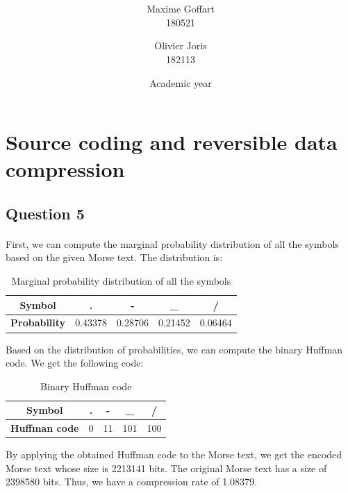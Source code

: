 \documentclass[a4paper, 11pt, oneside]{article}
\title{\ClassName\\\vspace*{0.8cm}\ProjectName\vspace{1cm}}
\author{Maxime Goffart \\180521 \and Olivier Joris\\182113}
\date{\vspace{1cm}Academic year \AcademicYear}
\begin{document}
\begin{titlingpage}
{\let\newpage\relax\maketitle}
\end{titlingpage}

\thispagestyle{empty}
\newpage






\section{Source coding and reversible data compression}

\subsection{Question 5}
\paragraph{}First, we can compute the marginal probability distribution of all the symbols based on the given Morse text. The distribution is:
\begin{table}[H]
    \centering
    \begin{tabular}{|c|c|c|c|c|}
    \hline
    \textbf{Symbol}      & . & - & \_ & / \\ \hline
    \textbf{Probability} & 0.43378 & 0.28706 & 0.21452 & 0.06464 \\ \hline
    \end{tabular}
    \caption{Marginal probability distribution of all the symbols}
\end{table}
Based on the distribution of probabilities, we can compute the binary Huffman code. We get the following code:
\begin{table}[H]
    \centering
    \begin{tabular}{|c|c|c|c|c|}
    \hline
    \textbf{Symbol}      & . & - & \_ & / \\ \hline
    \textbf{Huffman code} & 0 & 11 & 101 & 100 \\ \hline
    \end{tabular}
    \caption{Binary Huffman code}
\end{table}
By applying the obtained Huffman code to the Morse text, we get the encoded Morse text whose size is 2213141 bits. The original Morse text has a size of 2398580 bits. Thus, we have a compression rate of 1.08379.
\end{document}
